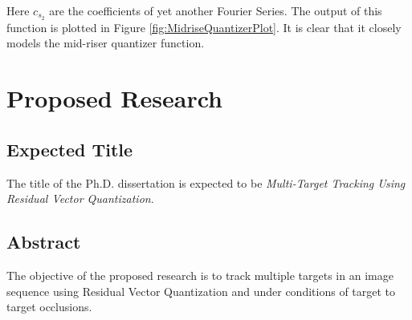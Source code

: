 \documentclass[12pt,letterpaper,doublespaced,ETD,proposal]{gt-ece-thesis}
\begin{document}
\begin{Body}
Here $c_{s_2}$ are the coefficients of yet another Fourier Series.  The output of this function is plotted in Figure 	\ref{fig:MidriseQuantizerPlot}.  It is clear that it closely models the mid-riser quantizer function.			

\newpage
\section{Proposed Research}
\label{proposed}
\subsection{Expected Title}
The title of the Ph.D. dissertation is expected to be \emph{Multi-Target Tracking Using Residual Vector Quantization}.

\subsection{Abstract}
The objective of the proposed research is to track multiple targets in an image sequence using Residual Vector Quantization and under conditions of target to target occlusions. 


\end{Body}
\end{document}
